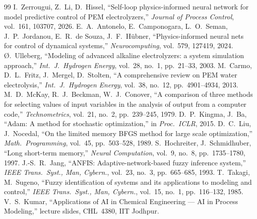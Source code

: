 \documentclass[11pt,a4paper]{article}
\begin{document}
\begin{thebibliography}{99}
 I.~Zerrougui, Z.~Li, D.~Hissel, ``Self-loop physics-informed neural network for model predictive control of PEM electrolyzers,'' \emph{Journal of Process Control}, vol.~161, 103707, 2026.
 E.~A.~Antonelo, E.~Camponogara, L.~O.~Seman, J.~P.~Jordanou, E.~R.~de Souza, J.~F.~H\"ubner, ``Physics-informed neural nets for control of dynamical systems,'' \emph{Neurocomputing}, vol.~579, 127419, 2024.
 {\O}.~Ulleberg, ``Modeling of advanced alkaline electrolyzers: a system simulation approach,'' \emph{Int.\ J.\ Hydrogen Energy}, vol.~28, no.~1, pp.~21--33, 2003.
 M.~Carmo, D.~L.~Fritz, J.~Mergel, D.~Stolten, ``A comprehensive review on PEM water electrolysis,'' \emph{Int.\ J.\ Hydrogen Energy}, vol.~38, no.~12, pp.~4901--4934, 2013.
 M.~D.~McKay, R.~J.~Beckman, W.~J.~Conover, ``A comparison of three methods for selecting values of input variables in the analysis of output from a computer code,'' \emph{Technometrics}, vol.~21, no.~2, pp.~239--245, 1979.
 D.~P.~Kingma, J.~Ba, ``Adam: A method for stochastic optimization,'' in \emph{Proc.\ ICLR}, 2015.
 D.~C.~Liu, J.~Nocedal, ``On the limited memory BFGS method for large scale optimization,'' \emph{Math.\ Programming}, vol.~45, pp.~503--528, 1989.
 S.~Hochreiter, J.~Schmidhuber, ``Long short-term memory,'' \emph{Neural Computation}, vol.~9, no.~8, pp.~1735--1780, 1997.
 J.-S.~R.~Jang, ``ANFIS: Adaptive-network-based fuzzy inference system,'' \emph{IEEE Trans.\ Syst., Man, Cybern.}, vol.~23, no.~3, pp.~665--685, 1993.
 T.~Takagi, M.~Sugeno, ``Fuzzy identification of systems and its applications to modeling and control,'' \emph{IEEE Trans.\ Syst., Man, Cybern.}, vol.~15, no.~1, pp.~116--132, 1985.
 V.~S.~Kumar, ``Applications of AI in Chemical Engineering --- AI in Process Modeling,'' lecture slides, CHL~4380, IIT Jodhpur.
\end{thebibliography}

\clearpage
\appendix
\end{document}
